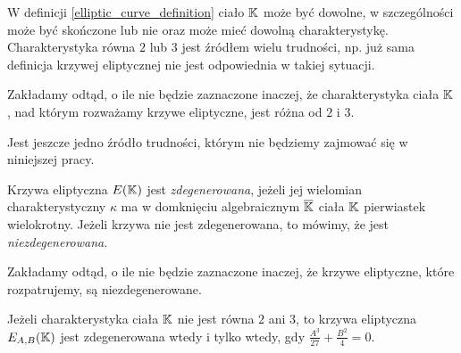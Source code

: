 W definicji \ref{elliptic_curve_definition} ciało $\mathbb{K}$ może być dowolne,
w szczególności może być skończone lub nie
oraz może mieć dowolną charakterystykę.
Charakterystyka równa $2$ lub $3$ jest źródłem wielu trudności,
np. już sama definicja krzywej eliptycznej
nie jest odpowiednia w takiej sytuacji.

\begin{remark}
Zakładamy odtąd, o ile nie będzie zaznaczone inaczej,
że charakterystyka ciała $\mathbb{K}$, nad którym rozważamy krzywe eliptyczne,
jest różna od $2$ i $3$.
\end{remark}

Jest jeszcze jedno źródło trudności,
którym nie będziemy zajmować się w niniejszej pracy.

\begin{definition}
Krzywa eliptyczna $E(\mathbb{K})$ jest \emph{zdegenerowana},
jeżeli jej wielomian charakterystyczny $\kappa$
ma w domknięciu algebraicznym $\overline{\mathbb{K}}$ ciała $\mathbb{K}$
pierwiastek wielokrotny.
Jeżeli krzywa nie jest zdegenerowana,
to mówimy, że jest \emph{niezdegenerowana}.
\end{definition}

\begin{remark}
Zakładamy odtąd, o ile nie będzie zaznaczone inaczej,
że krzywe eliptyczne, które rozpatrujemy,
są niezdegenerowane.
\end{remark}

\begin{theorem}
Jeżeli charakterystyka ciała $\mathbb{K}$ nie jest równa $2$ ani $3$,
to krzywa eliptyczna $E_{A,B}(\mathbb{K})$ jest zdegenerowana wtedy i tylko wtedy,
gdy $\frac{A^3}{27} + \frac{B^2}{4} = 0$.
\end{theorem}
